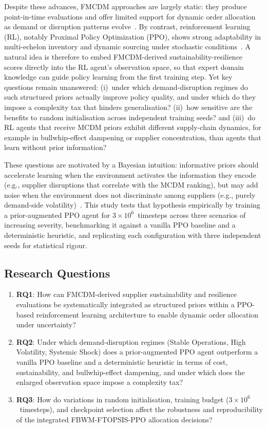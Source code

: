 \documentclass[preprint,12pt]{elsarticle}
\begin{document}
Despite these advances, FMCDM approaches are largely static: they produce point-in-time evaluations and offer limited support for dynamic order allocation as demand or disruption patterns evolve~\citep{Dubey_etal_2021}. By contrast, reinforcement learning (RL), notably Proximal Policy Optimization (PPO), shows strong adaptability in multi-echelon inventory and dynamic sourcing under stochastic conditions~\citep{Schulman_etal_2017,Wang_etal_2022}. A natural idea is therefore to embed FMCDM-derived sustainability-resilience scores directly into the RL agent's observation space, so that expert domain knowledge can guide policy learning from the first training step. Yet key questions remain unanswered: (i)~under which demand-disruption regimes do such structured priors actually improve policy quality, and under which do they impose a complexity tax that hinders generalisation? (ii)~how sensitive are the benefits to random initialisation across independent training seeds? and (iii)~do RL agents that receive MCDM priors exhibit different supply-chain dynamics, for example in bullwhip-effect dampening or supplier concentration, than agents that learn without prior information?

These questions are motivated by a Bayesian intuition: informative priors should accelerate learning when the environment activates the information they encode (e.g., supplier disruptions that correlate with the MCDM ranking), but may add noise when the environment does not discriminate among suppliers (e.g., purely demand-side volatility)~\citep{Chen_Kumar_2024}. This study tests that hypothesis empirically by training a prior-augmented PPO agent for $3\!\times\!10^{6}$~timesteps across three scenarios of increasing severity, benchmarking it against a vanilla PPO baseline and a deterministic heuristic, and replicating each configuration with three independent seeds for statistical rigour.

\subsection{Research Questions}
\begin{enumerate}
\item \textbf{RQ1}: How can FMCDM-derived supplier sustainability and resilience evaluations be systematically integrated as structured priors within a PPO-based reinforcement learning architecture to enable dynamic order allocation under uncertainty?
\item \textbf{RQ2}: Under which demand-disruption regimes (Stable Operations, High Volatility, Systemic Shock) does a prior-augmented PPO agent outperform a vanilla PPO baseline and a deterministic heuristic in terms of cost, sustainability, and bullwhip-effect dampening, and under which does the enlarged observation space impose a complexity tax?
\item \textbf{RQ3}: How do variations in random initialisation, training budget ($3\!\times\!10^{6}$~timesteps), and checkpoint selection affect the robustness and reproducibility of the integrated FBWM-FTOPSIS-PPO allocation decisions?
\end{enumerate}
\end{document}
